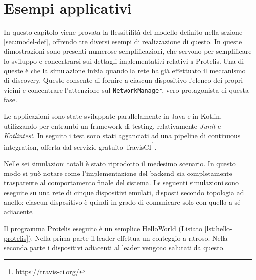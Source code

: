 \chapter{Esempi applicativi}
In questo capitolo viene provata la flessibilità del modello definito nella
sezione \ref{sec:model-def}, offrendo tre diversi esempi di realizzazione di
questo. In queste dimostrazioni sono presenti numerose semplificazioni, che
servono per semplificare lo sviluppo e concentrarsi sui dettagli implementativi
relativi a Protelis. Una di queste è che la simulazione inizia quando la rete ha
già effettuato il meccanismo di discovery. Questo consente di fornire a ciascun
dispositivo l'elenco dei propri vicini e concentrare l'attenzione sul
\texttt{NetworkManager}, vero protagonista di questa fase.

Le applicazioni sono state sviluppate parallelamente in Java e in Kotlin,
utilizzando per entrambi un framework di testing, relativamente \textit{Junit} e
\textit{Kotlintest}. In seguito i test sono stati agganciati ad una pipeline di
continuous integration, offerta dal servizio gratuito
TravisCI\footnote{https://travis-ci.org/}.

Nelle sei simulazioni totali è stato riprodotto il medesimo scenario. In questo
modo si può notare come l'implementazione del backend sia completamente
trasparente al comportamento finale del sistema. Le seguenti simulazioni sono
eseguite su una rete di cinque dispositivi emulati, disposti secondo topologia
ad anello: ciascun dispositivo è quindi in grado
di comunicare solo con quello a sé adiacente.

\begin{minipage}{\linewidth}

\end{minipage}

Il programma Protelis eseguito è un semplice HelloWorld (Listato
\ref{lst:hello-protelis}). Nella prima parte il leader effettua un conteggio a
ritroso. Nella seconda parte i dispositivi adiacenti al leader vengono salutati
da questo.

%
